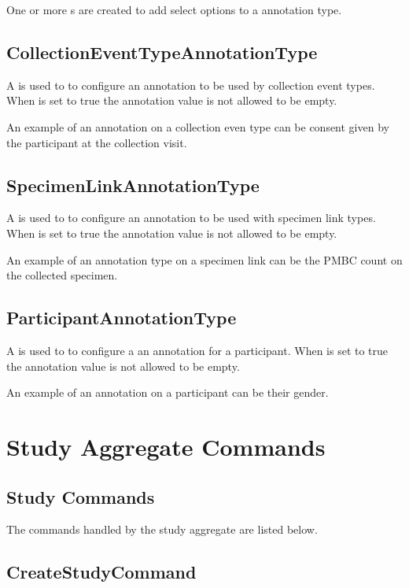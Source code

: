 One or more s are created to add select options to
a  annotation type.

\subsection*{CollectionEventTypeAnnotationType}

A  is used to to configure an
annotation to be used by collection event types. When  is set
to true the annotation value is not allowed to be empty.

An example of an annotation on a collection even type can be consent given by
the participant at the collection visit.

\subsection*{SpecimenLinkAnnotationType}

A  is used to to configure an
annotation to be used with specimen link types. When  is set
to true the annotation value is not allowed to be empty.

An example of an annotation type on a specimen link can be the PMBC count on
the collected specimen.

\subsection*{ParticipantAnnotationType}

A  is used to to configure a an
annotation for a participant. When  is set to true the
annotation value is not allowed to be empty.

An example of an annotation on a participant can be their gender.

\section {Study Aggregate Commands}

\subsection{Study Commands}
The commands handled by the study aggregate are listed below.

\subsection*{CreateStudyCommand}


